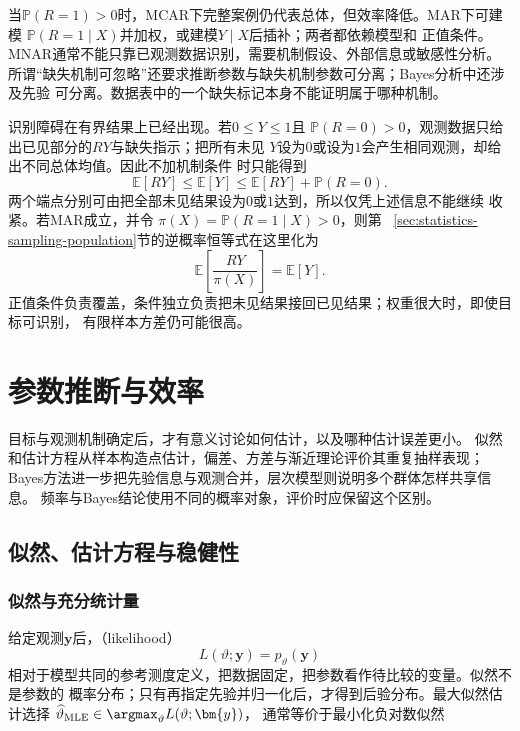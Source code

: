 当\(\mathbb{P}(R=1)>0\)时，MCAR下完整案例仍代表总体，但效率降低。MAR下可建模
\(\mathbb{P}(R=1\mid X)\)并加权，或建模\(Y\mid X\)后插补；两者都依赖模型和
正值条件。MNAR通常不能只靠已观测数据识别，需要机制假设、外部信息或敏感性分析。
所谓“缺失机制可忽略”还要求推断参数与缺失机制参数可分离；Bayes分析中还涉及先验
可分离。数据表中的一个缺失标记本身不能证明属于哪种机制。

识别障碍在有界结果上已经出现。若\(0\leq Y\leq1\)且
\(\mathbb{P}(R=0)>0\)，观测数据只给出已见部分的\(RY\)与缺失指示；把所有未见
\(Y\)设为\(0\)或设为\(1\)会产生相同观测，却给出不同总体均值。因此不加机制条件
时只能得到
\[
  \mathbb{E}[RY]
  \leq\mathbb{E}[Y]
  \leq\mathbb{E}[RY]+\mathbb{P}(R=0).
\]
两个端点分别可由把全部未见结果设为\(0\)或\(1\)达到，所以仅凭上述信息不能继续
收紧。若MAR成立，并令
\(\pi(X)=\mathbb{P}(R=1\mid X)>0\)，则第
~\ref{sec:statistics-sampling-population}节的逆概率恒等式在这里化为
\[
  \mathbb{E}\left[\frac{RY}{\pi(X)}\right]
  =\mathbb{E}[Y].
\]
正值条件负责覆盖，条件独立负责把未见结果接回已见结果；权重很大时，即使目标可识别，
有限样本方差仍可能很高。

\section{参数推断与效率}
\label{sec:stats-parameter-inference-efficiency}

目标与观测机制确定后，才有意义讨论如何估计，以及哪种估计误差更小。
似然和估计方程从样本构造点估计，偏差、方差与渐近理论评价其重复抽样表现；
Bayes方法进一步把先验信息与观测合并，层次模型则说明多个群体怎样共享信息。
频率与Bayes结论使用不同的概率对象，评价时应保留这个区别。

\subsection{似然、估计方程与稳健性}
\label{sec:statistics-likelihood-robustness}

\subsubsection{似然与充分统计量}

给定观测\(\bm{y}\)后，（likelihood）
\[
  L(\vartheta;\bm{y})=p_\vartheta(\bm{y})
\]
相对于模型共同的参考测度定义，把数据固定，把参数看作待比较的变量。似然不是参数的
概率分布；只有再指定先验并归一化后，才得到后验分布。最大似然估计选择
\(\widehat\vartheta_{\mathrm{MLE}}\in\argmax_\vartheta L(\vartheta;\bm{y})\)，
通常等价于最小化负对数似然

